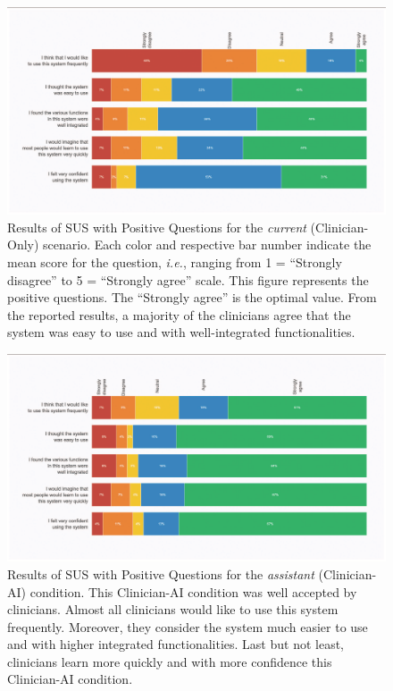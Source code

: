 \begin{figure}[htpb]
\centering
\includegraphics[width=\textwidth]{images/fig033}
\caption{Results of SUS with Positive Questions for the {\it current} (Clinician-Only) scenario. Each color and respective bar number indicate the mean score for the question, {\it i.e.}, ranging from 1 = ``Strongly disagree'' to 5 = ``Strongly agree'' scale. This figure represents the positive questions. The ``Strongly agree'' is the optimal value. From the reported results, a majority of the clinicians agree that the system was easy to use and with well-integrated functionalities.}
\label{fig:fig033}
\end{figure}

\begin{figure}[htpb]
\centering
\includegraphics[width=\textwidth]{images/fig034}
\caption{Results of SUS with Positive Questions for the {\it assistant} (Clinician-AI) condition. This Clinician-AI condition was well accepted by clinicians. Almost all clinicians would like to use this system frequently. Moreover, they consider the system much easier to use and with higher integrated functionalities. Last but not least, clinicians learn more quickly and with more confidence this Clinician-AI condition.}
\label{fig:fig034}
\end{figure}

